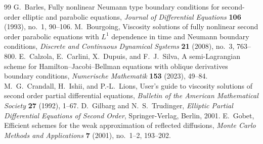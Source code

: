\documentclass[10pt,a4paper]{amsart}
\begin{document}
\begin{thebibliography}{99}
 G.~Barles, Fully nonlinear Neumann type boundary conditions for second-order elliptic and parabolic equations, \emph{Journal of Differential Equations} \textbf{106} (1993), no.~1, 90--106.
 M.~Bourgoing, Viscosity solutions of fully nonlinear second order parabolic equations with $L^1$ dependence in time and Neumann boundary conditions, \emph{Discrete and Continuous Dynamical Systems} \textbf{21} (2008), no.~3, 763--800.
 E.~Calzola, E.~Carlini, X.~Dupuis, and F.~J.~Silva, A semi-Lagrangian scheme for Hamilton--Jacobi--Bellman equations with oblique derivatives boundary conditions, \emph{Numerische Mathematik} \textbf{153} (2023), 49--84.
 M.~G.~Crandall, H.~Ishii, and P.-L.~Lions, User's guide to viscosity solutions of second order partial differential equations, \emph{Bulletin of the American Mathematical Society} \textbf{27} (1992), 1--67.
 D.~Gilbarg and N.~S.~Trudinger, \emph{Elliptic Partial Differential Equations of Second Order}, Springer-Verlag, Berlin, 2001.
 E.~Gobet, Efficient schemes for the weak approximation of reflected diffusions, \emph{Monte Carlo Methods and Applications} \textbf{7} (2001), no.~1--2, 193--202.
\end{thebibliography}
\end{document}
